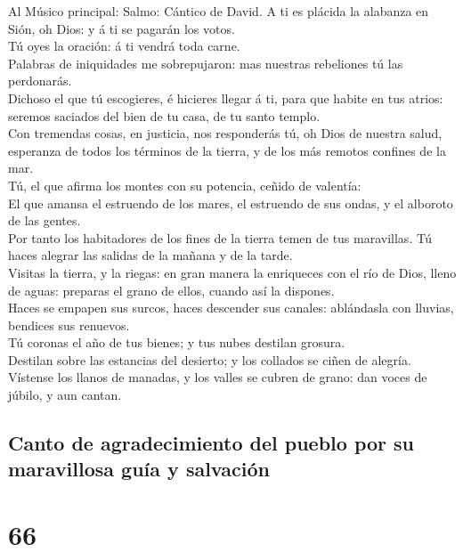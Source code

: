  Al Músico principal: Salmo: Cántico de David. A ti es
plácida la alabanza en Sión, oh Dios: y á ti se pagarán los votos.\\
 Tú oyes la oración: á ti vendrá toda carne.\\
 Palabras de iniquidades me sobrepujaron: mas nuestras
rebeliones tú las perdonarás.\\
 Dichoso el que tú escogieres, é hicieres llegar á ti,
para que habite en tus atrios: seremos saciados del bien de tu casa, de
tu santo templo.\\
 Con tremendas cosas, en justicia, nos responderás tú, oh
Dios de nuestra salud, esperanza de todos los términos de la tierra, y
de los más remotos confines de la mar.\\
 Tú, el que afirma los montes con su potencia, ceñido de
valentía:\\
 El que amansa el estruendo de los mares, el estruendo de
sus ondas, y el alboroto de las gentes.\\
 Por tanto los habitadores de los fines de la tierra temen
de tus maravillas. Tú haces alegrar las salidas de la mañana y de la
tarde.\\
 Visitas la tierra, y la riegas: en gran manera la
enriqueces con el río de Dios, lleno de aguas: preparas el grano de
ellos, cuando así la dispones.\\
 Haces se empapen sus surcos, haces descender sus
canales: ablándasla con lluvias, bendices sus renuevos.\\
 Tú coronas el año de tus bienes; y tus nubes destilan
grosura.\\
 Destilan sobre las estancias del desierto; y los
collados se ciñen de alegría.\\
 Vístense los llanos de manadas, y los valles se cubren
de grano: dan voces de júbilo, y aun cantan.

\hypertarget{canto-de-agradecimiento-del-pueblo-por-su-maravillosa-guuxeda-y-salvaciuxf3n}{%
\subsection{Canto de agradecimiento del pueblo por su maravillosa guía y
salvación}\label{canto-de-agradecimiento-del-pueblo-por-su-maravillosa-guuxeda-y-salvaciuxf3n}}

\hypertarget{section-19-66}{%
\section{66}\label{section-19-66}}

